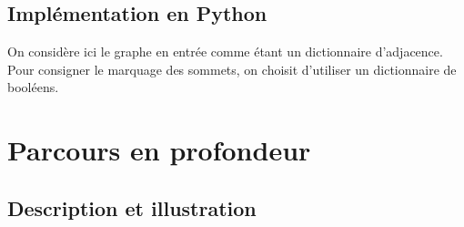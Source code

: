 \documentclass[11pt]{article}
\begin{document}
\FloatBarrier



\subsection{Implémentation en Python}

On considère ici le graphe en entrée comme étant un dictionnaire d'adjacence. Pour consigner le marquage des sommets, on choisit d'utiliser un dictionnaire de booléens.



\section{Parcours en profondeur}

\subsection{Description et illustration}
\end{document}
